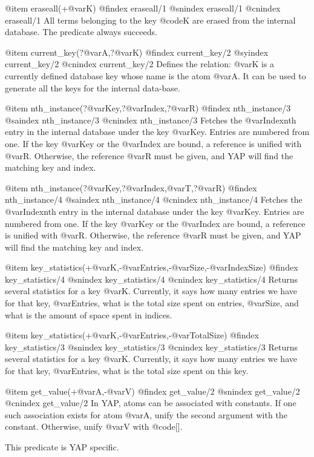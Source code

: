 {{{{{@item eraseall(+@var{K})
@findex eraseall/1
@snindex eraseall/1
@cnindex eraseall/1
All terms belonging to the key @code{K} are erased from the internal
database. The predicate always succeeds.

@item current_key(?@var{A},?@var{K})
@findex current_key/2
@syindex current_key/2
@cnindex current_key/2
Defines the relation: @var{K} is a currently defined database key whose
name is the atom @var{A}. It can be used to generate all the keys for
the internal data-base.

@item nth_instance(?@var{Key},?@var{Index},?@var{R})
@findex nth_instance/3
@saindex nth_instance/3
@cnindex nth_instance/3
Fetches the @var{Index}nth entry in the internal database under the key
@var{Key}. Entries are numbered from one. If the key @var{Key} or the
@var{Index} are bound, a reference is unified with @var{R}. Otherwise,
the reference @var{R} must be given, and YAP will find
the matching key and index.


@item nth_instance(?@var{Key},?@var{Index},@var{T},?@var{R})
@findex nth_instance/4
@saindex nth_instance/4
@cnindex nth_instance/4
Fetches the @var{Index}nth entry in the internal database under the key
@var{Key}. Entries are numbered from one. If the key @var{Key} or the
@var{Index} are bound, a reference is unified with @var{R}. Otherwise,
the reference @var{R} must be given, and YAP will find
the matching key and index.

@item key_statistics(+@var{K},-@var{Entries},-@var{Size},-@var{IndexSize})
@findex key_statistics/4
@snindex key_statistics/4
@cnindex key_statistics/4
Returns several statistics for a key @var{K}. Currently, it says how
many entries we have for that key, @var{Entries}, what is the
total size spent on entries, @var{Size}, and what is the amount of
space spent in indices.

@item key_statistics(+@var{K},-@var{Entries},-@var{TotalSize})
@findex key_statistics/3
@snindex key_statistics/3
@cnindex key_statistics/3
Returns several statistics for a key @var{K}. Currently, it says how
many entries we have for that key, @var{Entries}, what is the
total size spent on this key.

@item get_value(+@var{A},-@var{V})
@findex get_value/2
@snindex get_value/2
@cnindex get_value/2
In YAP, atoms can be associated with constants. If one such
association exists for atom @var{A}, unify the second argument with the
constant. Otherwise, unify @var{V} with @code{[]}.

This predicate is YAP specific.

}}}}}
